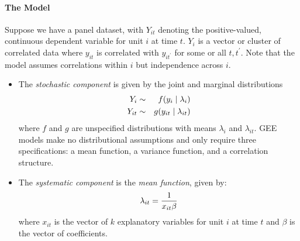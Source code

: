 \documentclass[letterpaper,10pt,english]{sphinxmanual}
\begin{document}
\paragraph{The Model}
\label{zelig-gammagee:the-model}
Suppose we have a panel dataset, with \(Y_{it}\) denoting the
positive-valued, continuous dependent variable for unit \(i\) at
time \(t\). \(Y_{i}\) is a vector or cluster of correlated data
where \(y_{it}\) is correlated with \(y_{it^\prime}\) for some
or all \(t, t^\prime\). Note that the model assumes correlations
within \(i\) but independence across \(i\).
\begin{itemize}
\item {} 
The \emph{stochastic component} is given by the joint and marginal
distributions
\begin{gather}
\begin{split}\begin{aligned}
Y_{i} &\sim& f(y_{i} \mid \lambda_{i})\\
Y_{it} &\sim& g(y_{it} \mid \lambda_{it})\end{aligned}\end{split}\notag
\end{gather}
where \(f\) and \(g\) are unspecified distributions with
means \(\lambda_{i}\) and \(\lambda_{it}\). GEE models make
no distributional assumptions and only require three specifications:
a mean function, a variance function, and a correlation structure.

\item {} 
The \emph{systematic component} is the \emph{mean function}, given by:
\begin{gather}
\begin{split}\lambda_{it} = \frac{1}{x_{it} \beta}\end{split}\notag
\end{gather}
where \(x_{it}\) is the vector of \(k\) explanatory variables
for unit \(i\) at time \(t\) and \(\beta\) is the vector
of coefficients.


\end{itemize}
\end{document}
